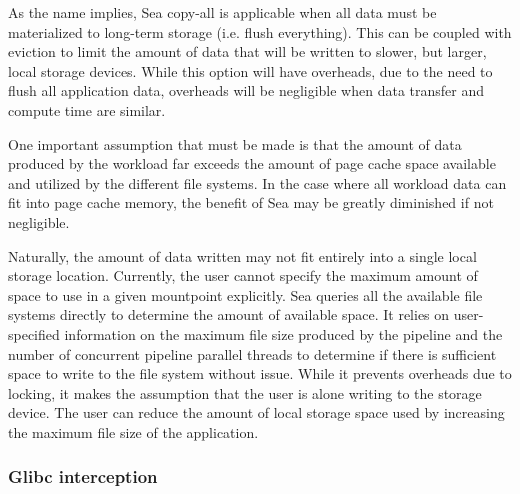 \documentclass[10pt,journal,compsoc]{IEEEtran}
\newcommand{\todo}[1]{\marginpar{\parbox{18mm}{\flushleft\tiny\color{red}\textbf{TODO}:
#1}}}
\begin{document}
As the name implies, Sea copy-all is applicable when all data must be
materialized to long-term storage (i.e. flush everything). This can be coupled
with eviction to limit the amount of data that will be written to slower, but
larger, local storage devices. While this option will have overheads, due to the
need to flush all application data, overheads will be negligible when data transfer and compute time
are similar. 


One important assumption that must be made is that the amount of data produced
by the workload far exceeds the amount of page cache space available and
utilized by the different file systems. In the case where all workload data can
fit into page cache memory, the benefit of Sea may be greatly diminished if not
negligible.

Naturally, the amount of data written may not fit entirely into a single local
storage location. Currently, the user cannot specify the maximum amount of space
to use in a given mountpoint explicitly. Sea queries all the available file
systems directly to determine the amount of available space. It relies on
user-specified information on the maximum file size produced by the pipeline and
the number of concurrent pipeline parallel threads to determine if there is
sufficient space to write to the file system without issue. While it prevents
overheads due to locking, it makes the assumption that the user is alone writing
to the storage device. The user can reduce the amount of local storage space
used by increasing the maximum file size of the application.


\subsubsection{Glibc interception}
\end{document}
